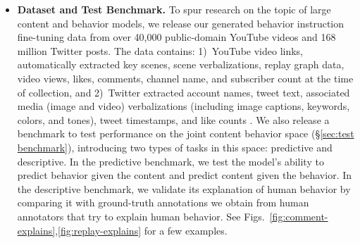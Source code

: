 \begin{itemize}[leftmargin=*]
    \item\textbf{Dataset and Test Benchmark.} To spur research on the topic of large content and behavior models, we release our generated behavior instruction fine-tuning data from over 40,000 public-domain YouTube videos and 168 million Twitter posts. The data contains: 1)~YouTube video links, automatically extracted key scenes, scene verbalizations, replay graph data, video views, likes, comments, channel name, and subscriber count at the time of collection, and 2)~Twitter extracted account names, tweet text, associated media (image and video) verbalizations (including image captions, keywords, colors, and tones), tweet timestamps, and like counts \cite{khurana2023behavior}. We also release a benchmark to test performance on the joint content behavior space (\S\ref{sec:test benchmark}), introducing two types of tasks in this space: predictive and descriptive. In the predictive benchmark, we test the model's ability to predict behavior given the content and predict content given the behavior. In the descriptive benchmark, we validate its explanation of human behavior by comparing it with ground-truth annotations we obtain from human annotators that try to explain human behavior. See Figs.~\ref{fig:comment-explains},\ref{fig:replay-explains} for a few examples.
\end{itemize}














